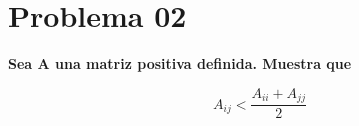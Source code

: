 \section*{Problema 02}

\textbf{Sea A una matriz positiva definida. Muestra que}

\begin{equation*}
    A_{ij} < \frac{A_{ii}+A_{jj}}{2}
\end{equation*}
